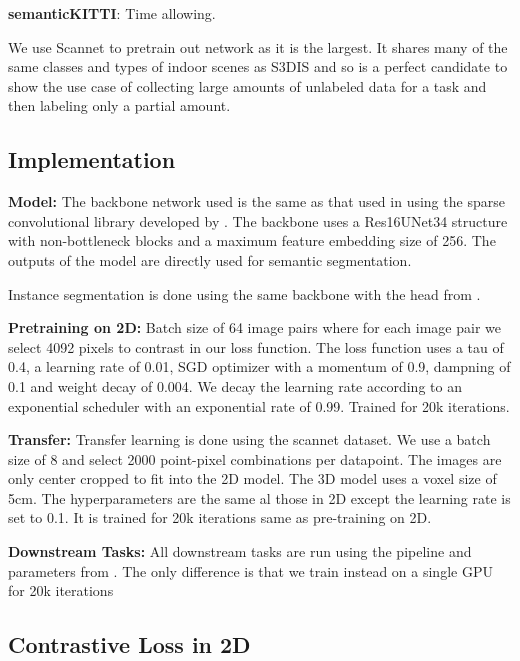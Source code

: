 \documentclass[10pt,twocolumn,letterpaper]{article}
\begin{document}
\textbf{semanticKITTI}: Time allowing.

We use Scannet to pretrain out network as it is the largest. It shares many of the same classes and types of indoor scenes as S3DIS and so is a perfect candidate to show the use case of collecting large amounts of unlabeled data for a task and then labeling only a partial amount.

\subsection{Implementation}
\label{sec:results:implementation}

\textbf{Model:} The backbone network used is the same as that used in \cite{xie2020pointcontrast, hou2021Exploring} using the sparse convolutional library developed by \cite{choy20194d}. The backbone uses a Res16UNet34 structure with non-bottleneck blocks and a maximum feature embedding size of 256. The outputs of the model are directly used for semantic segmentation.

Instance segmentation is done using the same backbone with the head from \cite{jiang2020pointgroup}.

\textbf{Pretraining on 2D:} Batch size of 64 image pairs where for each image pair we select 4092 pixels to contrast in our loss function. The loss function uses a tau of 0.4, a learning rate of 0.01, SGD optimizer with a momentum of 0.9, dampning of 0.1 and weight decay of 0.004. We decay the learning rate according to an exponential scheduler with an exponential rate of 0.99. Trained for 20k iterations.

\textbf{Transfer:} Transfer learning is done using the scannet dataset. We use a batch size of 8 and select 2000 point-pixel combinations per datapoint. The images are only center cropped to fit into the 2D model. The 3D model uses a voxel size of 5cm. The hyperparameters are the same al those in 2D except the learning rate is set to 0.1. It is trained for 20k iterations same as pre-training on 2D.

\textbf{Downstream Tasks:} All downstream tasks are run using the pipeline and parameters from \cite{hou2021Exploring}. The only difference is that we train instead on a single GPU for 20k iterations

\subsection{Contrastive Loss in 2D}
\label{sec:results:2d}
\end{document}
